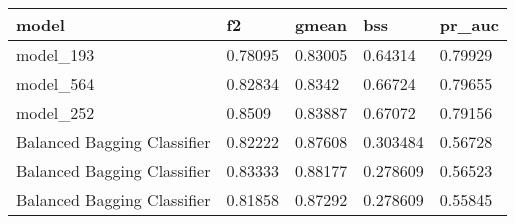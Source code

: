 \begin{tabular}{|l|l|l|l|l|}
\hline
\textbf{model}              & \textbf{f2} & \textbf{gmean} & \textbf{bss} & \textbf{pr\_auc} \\ \hline
model\_193                  & 0.78095     & 0.83005        & 0.64314      & 0.79929          \\ \hline
model\_564                  & 0.82834     & 0.8342         & 0.66724      & 0.79655          \\ \hline
model\_252                  & 0.8509      & 0.83887        & 0.67072      & 0.79156          \\ \hline
Balanced Bagging Classifier & 0.82222     & 0.87608        & 0.303484     & 0.56728          \\ \hline
Balanced Bagging Classifier & 0.83333     & 0.88177        & 0.278609     & 0.56523          \\ \hline
Balanced Bagging Classifier & 0.81858     & 0.87292        & 0.278609     & 0.55845          \\ \hline
\end{tabular}